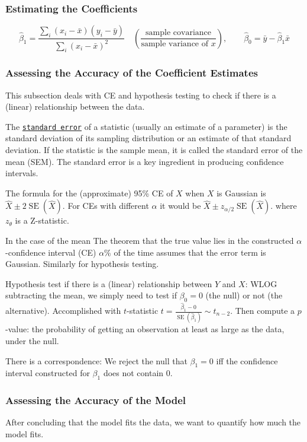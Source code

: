 \documentclass[11pt]{article}
\theoremstyle{definition}
\newcommand{\SE}{\operatorname{SE}}
\begin{document}
\subsubsection{Estimating the Coefficients}
\[ \hat\beta_1 = \frac{ \sum_i (x_i - \bar x )(y_i - \bar y) }{\sum_i (x_i -\bar x)^2 }\quad (\frac{\text{sample covariance}}{\text{sample variance of $x$}}),\qquad \hat \beta_0 = \bar y - \hat \beta_1 \bar x\]
 
\subsubsection{Assessing the Accuracy of the Coefficient Estimates}
This subsection deals with CE and hypothesis testing to check if there is a (linear) relationship between the data.

The \href{https://en.wikipedia.org/wiki/Standard_error}{\texttt{standard error}} of a statistic (usually an estimate of a parameter) is the standard deviation of its sampling distribution or an estimate of that standard deviation. If the statistic is the sample mean, it is called the standard error of the mean (SEM). The standard error is a key ingredient in producing confidence intervals.

The formula for the (approximate) 95\% CE of $X$ when $X$ is Gaussian is $\hat X \pm 2\SE(\hat X) $. For CEs with different $\alpha$ it would be $\hat X \pm z_{\alpha/2}\SE(\hat X)$. where $z_\theta$ is a Z-statistic.

In the case of the mean
The theorem that the true value lies in the constructed $\alpha$-confidence interval (CE) $\alpha$\% of the time assumes that the error term is Gaussian. Similarly for hypothesis testing.

Hypothesis test if there is a (linear) relationship between $Y$ and $X$: WLOG subtracting the mean, we simply need to test if $\beta_0 = 0$ (the null) or not (the alternative). Accomplished with $t$-statistic  $t=\frac{\hat\beta_1 - 0}{\SE(\hat\beta_1)} \sim t_{n-2}$. Then compute a $p$-value: the probability of getting an observation at least as large as the data, under the null.

There is a correspondence: We reject the null that $\beta_1=0$ iff the confidence interval constructed for $\beta_1$ does not contain 0.

\subsubsection{Assessing the Accuracy of the Model}
After concluding that the model fits the data, we want to quantify how much the model fits.
\end{document}
